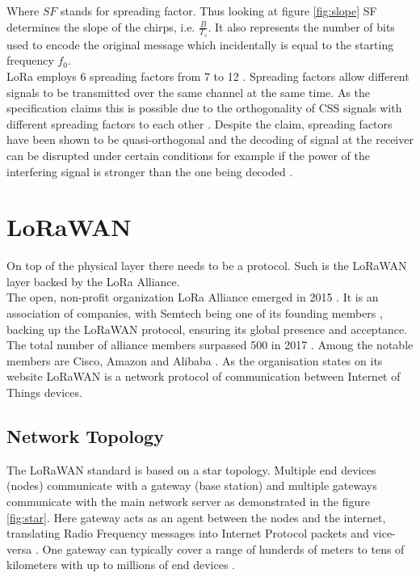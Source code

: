 Where $SF$ stands for spreading factor. Thus
looking at figure \ref{fig:slope} SF determines
the slope of the chirps, i.e. $\frac{B}{T_s}$. It
also represents the number of bits used to encode
the original message \cite{sf_article} which
incidentally is equal to the starting
frequency  $f_0$.\\

LoRa employs 6 spreading factors from 7 to 12 \cite{semtech_spec}. Spreading factors allow different signals to be transmitted over the same channel at the same time. As the specification claims this is possible due to the orthogonality of CSS signals with different spreading factors to each other \cite{semtech_spec}.
Despite the claim, spreading factors have been shown to be quasi-orthogonal and the decoding of signal at the receiver can be disrupted under certain conditions for example if the power of the interfering signal is stronger than the one being decoded \cite{imperfect_1}.

\section{LoRaWAN}

On top of the physical layer there needs to be a protocol. Such is the LoRaWAN layer backed by the LoRa Alliance.\\

The open, non-profit organization LoRa Alliance emerged in 2015 \cite{alliance}. It is an association of companies, with Semtech being one of its founding members \cite{alliance_founder}, backing up the LoRaWAN protocol, ensuring its global presence and acceptance. The total number of alliance members surpassed 500 in 2017 \cite{500_members}. Among the notable members are Cisco, Amazon and Alibaba \cite{alliance_members}.  As the organisation states on its website \cite{lora_alliance_about_lorawan} LoRaWAN is a network protocol of communication between Internet of Things devices.

\subsection{Network Topology}

The LoRaWAN standard is based on a star topology.
Multiple end devices (nodes) communicate with a gateway (base station) and multiple gateways communicate with the main network server as demonstrated in the figure \ref{fig:star}. Here gateway acts as an agent between the nodes and the internet, translating Radio Frequency messages into Internet Protocol packets and vice-versa \cite{lora_alliance_about_lorawan}.
One gateway can typically cover a range of hunderds of meters to tens of kilometers with up to millions of end devices \cite{doppler}.


